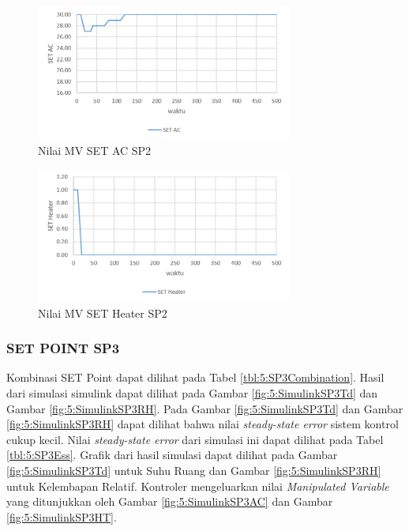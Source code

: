 \begin{figure}[!h]
	\centering
	\includegraphics[width=0.75\textwidth]{figures/SimulinkSP2AC}
	\caption{Nilai MV SET AC SP2}
	\label{fig:5:SimulinkSP2AC}
\end{figure}

\begin{figure}[!h]
	\centering
	\includegraphics[width=0.75\textwidth]{figures/SimulinkSP2HT}
	\caption{Nilai MV SET Heater SP2}
	\label{fig:5:SimulinkSP2HT}
\end{figure}

\subsubsection{SET POINT SP3}

Kombinasi SET Point dapat dilihat pada Tabel \ref{tbl:5:SP3Combination}. Hasil dari simulasi simulink dapat dilihat pada Gambar \ref{fig:5:SimulinkSP3Td} dan Gambar \ref{fig:5:SimulinkSP3RH}. Pada Gambar \ref{fig:5:SimulinkSP3Td} dan Gambar \ref{fig:5:SimulinkSP3RH} dapat dilihat bahwa nilai \textit{steady-state error} sistem kontrol cukup kecil. Nilai \textit{steady-state error} dari simulasi ini dapat dilihat pada Tabel \ref{tbl:5:SP3Ess}. Grafik dari hasil simulasi dapat dilihat pada Gambar \ref{fig:5:SimulinkSP3Td} untuk Suhu Ruang dan Gambar \ref{fig:5:SimulinkSP3RH} untuk Kelembapan Relatif. Kontroler mengeluarkan nilai \textit{Manipulated Variable} yang ditunjukkan oleh Gambar \ref{fig:5:SimulinkSP3AC} dan Gambar \ref{fig:5:SimulinkSP3HT}.

